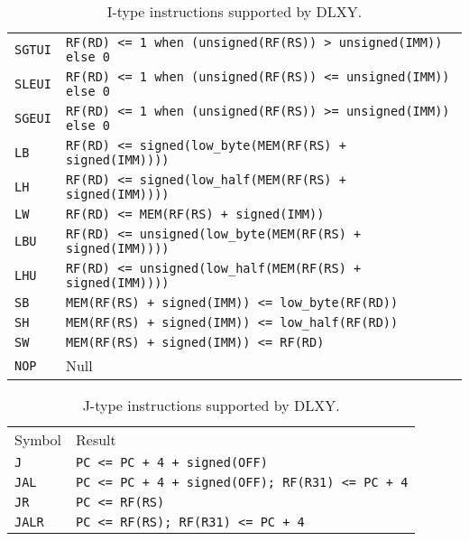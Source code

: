 \begin{table}[H]
\begin{tabular}{ll}
		\rowcolor{gray!25}
		\texttt{SGTUI} & \texttt{RF(RD) <= 1 when (unsigned(RF(RS)) > unsigned(IMM)) else 0} \\
		\texttt{SLEUI} & \texttt{RF(RD) <= 1 when (unsigned(RF(RS)) <= unsigned(IMM)) else 0} \\
		\rowcolor{gray!25}
		\texttt{SGEUI} & \texttt{RF(RD) <= 1 when (unsigned(RF(RS)) >= unsigned(IMM)) else 0} \\
		\texttt{LB} & \texttt{RF(RD) <= signed(low\_byte(MEM(RF(RS) + signed(IMM))))} \\
		\rowcolor{gray!25}
		\texttt{LH} & \texttt{RF(RD) <= signed(low\_half(MEM(RF(RS) + signed(IMM))))} \\
		\texttt{LW} & \texttt{RF(RD) <= MEM(RF(RS) + signed(IMM))} \\
		\rowcolor{gray!25}
		\texttt{LBU} & \texttt{RF(RD) <= unsigned(low\_byte(MEM(RF(RS) + signed(IMM))))} \\
		\texttt{LHU} & \texttt{RF(RD) <= unsigned(low\_half(MEM(RF(RS) + signed(IMM))))} \\
		\rowcolor{gray!25}
		\texttt{SB} & \texttt{MEM(RF(RS) + signed(IMM)) <= low\_byte(RF(RD))} \\
		\texttt{SH} & \texttt{MEM(RF(RS) + signed(IMM)) <= low\_half(RF(RD))} \\
		\rowcolor{gray!25}
		\texttt{SW} & \texttt{MEM(RF(RS) + signed(IMM)) <= RF(RD)} \\
		\texttt{NOP} & Null \\
		\hline
	\end{tabular}
	\caption{I-type instructions supported by DLXY.}
	\label{tab:i_type_inst}
\end{table}

\begin{table}[H]
	\centering
	\begin{tabular}{ll}
		\hline
		\rowcolor{gray!50}
		Symbol & Result \\
		\texttt{J} & \texttt{PC <= PC + 4 + signed(OFF)} \\
		\rowcolor{gray!25}
		\texttt{JAL} & \texttt{PC <= PC + 4 + signed(OFF); RF(R31) <= PC + 4} \\
		\texttt{JR} & \texttt{PC <= RF(RS)} \\
		\rowcolor{gray!25}
		\texttt{JALR} & \texttt{PC <= RF(RS); RF(R31) <= PC + 4} \\
		\hline
	\end{tabular}
	\caption{J-type instructions supported by DLXY.}
	\label{tab:j_type_inst}
\end{table}

